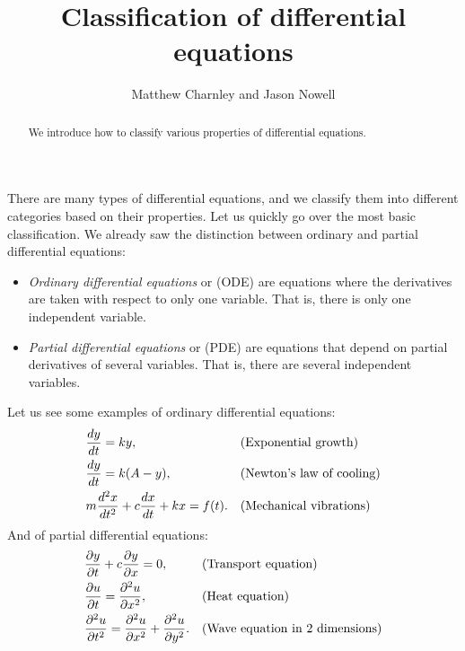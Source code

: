 \documentclass{ximera}
\title{Classification of differential equations}
\author{Matthew Charnley and Jason Nowell}
\begin{document}
\begin{abstract}
    We introduce how to classify various properties of differential equations.
\end{abstract}
\maketitle

\label{classification:section}


There are many types of differential equations, and we classify them into different categories based on their properties.  Let us quickly go over the most basic classification.  We already saw the distinction between ordinary and partial differential equations:

\begin{definition}
    \begin{itemize}
        \item \emph{Ordinary differential equations} or (ODE) are equations where the derivatives are taken with respect to only one variable. That is, there is only one independent variable.
        \item \emph{Partial differential equations} or (PDE) are equations that depend on partial derivatives of several variables. That is, there are several independent variables.
    \end{itemize}
\end{definition}

Let us see some examples of ordinary differential equations:
\begin{align*}
    & \frac{d y}{dt} = ky , & & \text{(Exponential growth\index{exponential growth})} \\
    & \frac{d y}{dt} = k(A-y) , & & \text{(Newton's law of cooling)} \\
    & m \frac{d^2 x}{dt^2} + c \frac{dx}{dt} + kx = f(t) . & &
    \text{(Mechanical vibrations\index{mechanical vibrations})}
\end{align*}
And of partial differential equations:
\begin{align*}
    & \frac{\partial y}{\partial t} + c \frac{\partial y}{\partial x} = 0 , & & 
    \text{(Transport equation\index{transport equation})} \\
    & \frac{\partial u}{\partial t} = \frac{\partial^2 u}{\partial x^2} , & & 
    \text{(Heat equation\index{heat equation})} \\
    & \frac{\partial^2 u}{\partial t^2} = \frac{\partial^2 u}{\partial x^2} +
    \frac{\partial^2 u}{\partial y^2} . & & 
    \text{(Wave equation in 2 dimensions\index{wave equation in 2 dimensions})}
\end{align*}
\end{document}
